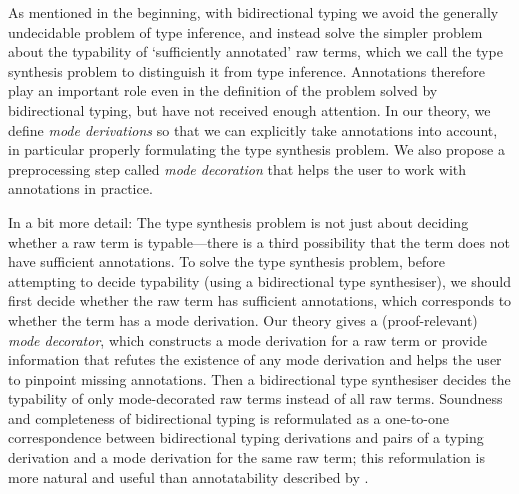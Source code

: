 As mentioned in the beginning, with bidirectional typing we avoid the generally undecidable problem of type inference, and instead solve the simpler problem about the typability of `sufficiently annotated' raw terms, which we call the type synthesis problem to distinguish it from type inference.
Annotations therefore play an important role even in the definition of the problem solved by bidirectional typing, but have not received enough attention.
In our theory, we define \emph{mode derivations} so that we can explicitly take annotations into account, in particular properly formulating the type synthesis problem.
We also propose a preprocessing step called \emph{mode decoration} that helps the user to work with annotations in practice.

In a bit more detail:
The type synthesis problem is not just about deciding whether a raw term is typable---there is a third possibility that the term does not have sufficient annotations.
To solve the type synthesis problem, before attempting to decide typability (using a bidirectional type synthesiser), we should first decide whether the raw term has sufficient annotations, which corresponds to whether the term has a mode derivation.
Our theory gives a (proof-relevant) \emph{mode decorator}, which constructs a mode derivation for a raw term or provide information that refutes the existence of any mode derivation and helps the user to pinpoint missing annotations.
Then a bidirectional type synthesiser decides the typability of only mode-decorated raw terms instead of all raw terms.
Soundness and completeness of bidirectional typing is reformulated as a one-to-one correspondence between bidirectional typing derivations and pairs of a typing derivation and a mode derivation for the same raw term; this reformulation is more natural and useful than annotatability described by \citet[Section~3.2]{Dunfield2021}.



